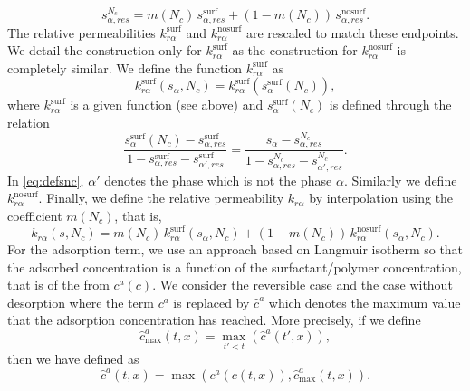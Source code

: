 \documentclass[11pt]{amsart}
\newcommand{\cads}{c^a}
\newcommand{\chatads}{\hat{c}^a}
\newcommand{\surf}{\text{surf}}
\newcommand{\nosurf}{\text{nosurf}}
\begin{document}
\begin{equation}
  \label{eq:srhat}
  s_{\alpha,res}^{N_c} = m(N_c)\,s_{\alpha,res}^{\surf} + (1 - m(N_c))\,s_{\alpha,res}^{\nosurf}.
\end{equation}
The relative permeabilities $k_{r\alpha}^{\surf}$ and $k_{r\alpha}^{\nosurf}$
are rescaled to match these endpoints. We detail the construction only for
$k_{r\alpha}^{\surf}$ as the construction for $k_{r\alpha}^{\nosurf}$ is
completely similar. We define the function $k_{r\alpha}^{\surf}$ as
\begin{equation}
\label{eq:rescaledkr}
k_{r\alpha}^{\surf}(s_\alpha, N_c) = k_{r\alpha}^{\surf}(s_\alpha^{\surf}(N_c)),
\end{equation}
where $k_{r\alpha}^{\surf}$ is a given function (see above) and $s_\alpha^{\surf}(N_c)$ is defined through the relation
\begin{equation}
  \label{eq:defsnc}
  \frac{s_\alpha^{\surf}(N_c) - s_{\alpha,res}^{\surf}}{1 - s_{\alpha,res}^{\surf} - s_{\alpha',res}^{\surf}} =   \frac{s_\alpha - s_{\alpha,res}^{N_c}}{1 - s_{\alpha,res}^{N_c} - s_{\alpha',res}^{N_c}}.
\end{equation}
In \eqref{eq:defsnc}, $\alpha'$ denotes the phase which is not the phase $\alpha$. Similarly we define $k_{r\alpha}^{\nosurf}$. Finally, we define the relative permeability $k_{r\alpha}$ by interpolation using the coefficient $m(N_c)$, that is,
\begin{equation}
  \label{eq:defkralpha}
  k_{r\alpha}(s, N_c) = m(N_c)\,k_{r\alpha}^{\surf}(s_\alpha, N_c) + (1 - m(N_c))\,k_{r\alpha}^{\nosurf}(s_\alpha, N_c).
\end{equation}
For the adsorption term, we use an approach based on Langmuir isotherm so that the adsorbed concentration is a function of the surfactant/polymer concentration, that is of the from $\cads(c)$. We consider the reversible case and the case without desorption where the term $\cads$ is replaced by
$\hat\cads$ which denotes the maximum value that the adsorption concentration has reached. More precisely, if we define
\begin{equation}
  \label{eq:chatadsmax}
  \chatads_{\max}(t,x) = \max_{t'<t}(\chatads(t',x)),
\end{equation}
then we have defined as
\begin{equation}
  \label{eq:defchatads}
  \chatads(t, x) = \max(\cads(c(t,x)), \chatads_{\max}(t,x)).
\end{equation}

\printbibliography
\end{document}
